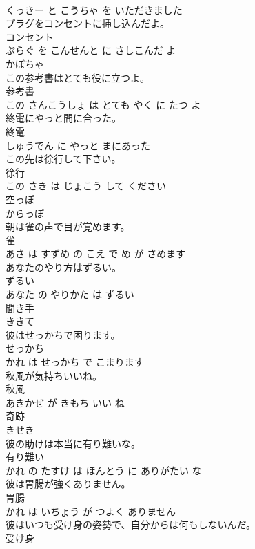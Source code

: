 \documentclass[8pt]{extreport}
\begin{document}
\begin{CJK}{UTF8}{min}
\\	くっきー と こうちゃ を いただきました			
\\	プラグをコンセントに挿し込んだよ。	
\\	コンセント 
\\	ぷらぐ を こんせんと に さしこんだ よ			
\\	かぼちゃ	
\\	この参考書はとても役に立つよ。	
\\	参考書 
\\	この さんこうしょ は とても やく に たつ よ			
\\	終電にやっと間に合った。	
\\	終電 
\\	しゅうでん に やっと まにあった			
\\	この先は徐行して下さい。	
\\	徐行 
\\	この さき は じょこう して ください			
\\	空っぽ	
\\	からっぽ		
\\	朝は雀の声で目が覚めます。	
\\	雀 
\\	あさ は すずめ の こえ で め が さめます			
\\	あなたのやり方はずるい。	
\\	ずるい 
\\	あなた の やりかた は ずるい			
\\	聞き手	
\\	ききて		
\\	彼はせっかちで困ります。	
\\	せっかち 
\\	かれ は せっかち で こまります			
\\	秋風が気持ちいいね。	
\\	秋風 
\\	あきかぜ が きもち いい ね			
\\	奇跡	
\\	きせき		
\\	彼の助けは本当に有り難いな。	
\\	有り難い 
\\	かれ の たすけ は ほんとう に ありがたい な			
\\	彼は胃腸が強くありません。	
\\	胃腸 
\\	かれ は いちょう が つよく ありません			
\\	彼はいつも受け身の姿勢で、自分からは何もしないんだ。	
\\	受け身 

\end{CJK}
\end{document}
